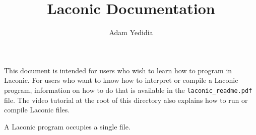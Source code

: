 \documentclass[11pt]{article}
\title{Laconic Documentation}
\author{Adam Yedidia}
\begin{document}
\maketitle

This document is intended for users who wish to learn how to program in Laconic. For users who want to know how to interpret or compile a Laconic program, information on how to do that is available in the \texttt{laconic_readme.pdf} file. The video tutorial at the root of this directory also explains how to run or compile Laconic files.

A Laconic program occupies a single file.
\end{document}
